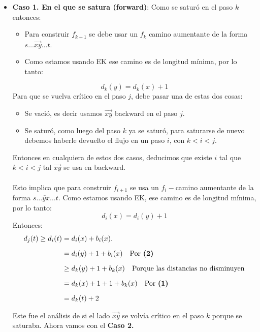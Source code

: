\documentclass[11pt, a4paper]{article}
\theoremstyle{definition}
\begin{document}
    \begin{itemize}
        \item \textbf{Caso 1. En el que se satura (forward)}: Como se saturó en el paso $k$ entonces:
            \begin{itemize}
                \item Para construir $f_{k+1}$ se debe usar un $f_k$ camino aumentante de la forma $s \ldots \overrightarrow{xy} \ldots t$.
                \item Como estamos usando EK ese camino es de longitud mínima, por lo tanto: 
            \end{itemize}
                \[
                    d_k(y)=d_k(x)+1 \tag{1}
                \]
            Para que se vuelva crítico en el paso $j$, debe pasar una de estas dos cosas:
            \begin{itemize}
                \item Se vació, es decir usamos $\overrightarrow{xy}$ backward en el paso $j$.
                \item Se saturó, como luego del paso $k$ ya se saturó, para saturarse de nuevo debemos haberle devuelto el flujo en un paso $i$, con $k<i<j$.
            \end{itemize}
            Entonces en cualquiera de estos dos casos, deducimos que existe $i$ tal que $k < i < j$ tal $\overrightarrow{xy}$ se usa en backward.\\ \\ 
            Esto implica que para construir $f_{i+1}$ se usa un $f_i-$camino aumentante de la forma $s \ldots \overleftarrow{yx} \ldots t$.
            Como estamos usando EK, ese camino es de longitud mínima, por lo tanto:
                \[
                    d_i(x)=d_i(y)+1 \tag{2}
                \]
            Entonces:
            \begin{align*}
                d_j(t) \geq d_i(t) &= d_i(x) + b_i(x). \\[6pt]
                &= d_i(y) + 1 + b_i(x) \quad \text{Por \textbf{(2)}} \\[6pt]
                &\geq d_k(y) + 1 + b_k(x) \quad \text{Porque las distancias no disminuyen} \\[6pt]
                &= d_k(x) + 1 + 1 + b_k(x) \quad \text{Por \textbf{(1)}} \\[6pt]
                &= d_k(t) + 2
                \end{align*}
                
                Este fue el análisis de si el lado $\overrightarrow{xy}$ se volvía crítico en el paso $k$ porque se saturaba. Ahora vamos con el 
                \textbf{Caso 2.}
            

\end{itemize}
\end{document}
